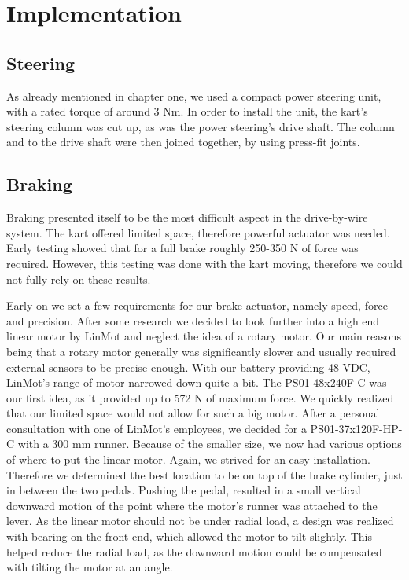 
\chapter{Implementation}
\label{chp:Implementation}

\section{Steering}

As already mentioned in chapter one, we used a compact power steering unit, with a rated torque of around 3 Nm. In order to install the unit, the kart's steering column was cut up, as was the power steering's drive shaft. The column and to the drive shaft were then joined together, by using press-fit joints.

\section{Braking}

Braking presented itself to be the most difficult aspect in the drive-by-wire system. The kart offered limited space, therefore powerful actuator was needed. Early testing showed that for a full brake roughly 250-350 N of force was required. However, this testing was done with the kart moving, therefore we could not fully rely on these results.

Early on we set a few requirements for our brake actuator, namely speed, force and precision. After some research we decided to look further into a high end linear motor by LinMot and neglect the idea of a rotary motor. Our main reasons being that a rotary motor generally was significantly slower and usually required external sensors to be precise enough. 
With our battery providing 48 VDC, LinMot's range of motor narrowed down quite a bit. The PS01-48x240F-C was our first idea, as it provided up to 572 N of maximum force. We quickly realized that our limited space would not allow for such a big motor. After a personal consultation with one of LinMot's employees, we decided for a PS01-37x120F-HP-C with a 300 mm runner. Because of the smaller size, we now had various options of where to put the linear motor. Again, we strived for an easy installation. Therefore we determined the best location to be on top of the brake cylinder, just in between the two pedals. Pushing the pedal, resulted in a small vertical downward motion of the point where the motor's runner was attached to the lever. As the linear motor should not be under radial load, a design was realized with bearing on the front end, which allowed the motor to tilt slightly. This helped reduce the radial load, as the downward motion could be compensated with tilting the motor at an angle.



